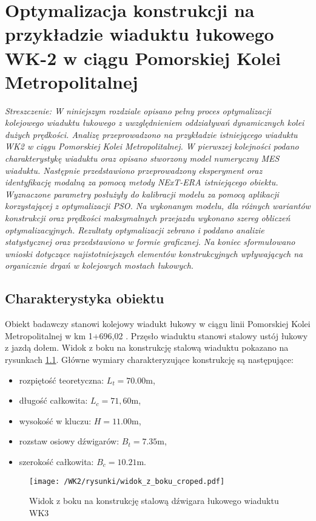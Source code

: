 \chapter{Optymalizacja konstrukcji na przykładzie wiaduktu łukowego WK-2 w ciągu Pomorskiej Kolei Metropolitalnej}

\textit{Streszczenie: W niniejszym rozdziale opisano pełny proces optymalizacji kolejowego wiaduktu łukowego z uwzględnieniem oddziaływań dynamicznych kolei dużych prędkości. Analizę przeprowadzono na przykładzie istniejącego wiaduktu WK2 w ciągu Pomorskiej Kolei Metropolitalnej. W pierwszej kolejności podano charakterystykę wiaduktu oraz opisano stworzony model numeryczny MES wiaduktu. Następnie przedstawiono przeprowadzony eksperyment oraz identyfikację modalną za pomocą metody NExT-ERA istniejącego obiektu. Wyznaczone parametry posłużyły do kalibracji modelu za pomocą aplikacji korzystającej z optymalizacji PSO. Na wykonanym modelu, dla różnych wariantów konstrukcji oraz prędkości maksymalnych przejazdu wykonano szereg obliczeń optymalizacyjnych. Rezultaty optymalizacji zebrano i poddano analizie statystycznej oraz przedstawiono w formie graficznej. Na koniec sformułowano wnioski dotyczące najistotniejszych elementów konstrukcyjnych wpływających na organicznie drgań w kolejowych mostach łukowych.}


\section{Charakterystyka obiektu}
Obiekt badawczy stanowi kolejowy wiadukt łukowy w ciągu linii Pomorskiej Kolei Metropolitalnej w km 1+696,02 \parencite{Filipiuk2015,TransprojektGdanski2014}. Przęsło wiaduktu stanowi stalowy ustój łukowy z jazdą dołem. Widok z boku na konstrukcję stalową wiaduktu pokazano na rysunkach \ref{fig: wk2_side_view}. Główne wymiary charakteryzujące konstrukcję są następujące: 
\begin{itemize}[noitemsep]
	\item rozpiętość teoretyczna: $L_t=70.00 \text{m}$, 
	\item długość całkowita:  $L_c=71,60 \text{m}$, 
	\item wysokość w kluczu:  $H=11.00 \text{m}$,
	\item rozstaw osiowy dźwigarów: $B_t = 7.35 \text{m}$,
	\item szerokość całkowita: $B_c=10.21 \text{m}$. 
\end{itemize}
 \begin{figure}[hbt!]
	\centering
	\texttt{[image: /WK2/rysunki/widok\_z\_boku\_croped.pdf]}
	\captionsetup{justification=centering}
	\caption{Widok z boku na konstrukcję stalową dźwigara łukowego wiaduktu WK3}
	\label{fig: wk2_side_view}
\end{figure}

